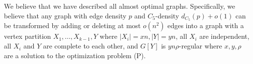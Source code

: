 \documentclass[12pt]{article}
\def\MR#1{}
\theoremstyle{definition}
\theoremstyle{remark}
\begin{document}
We believe that we have described all almost optimal graphs. Specifically, we believe that any graph with edge density $p$ and $C_5$-density $d_{C_5}(p)+o(1)$ can be transformed by adding or deleting at most $o(n^2)$ edges into a graph with a vertex partition $X_1, \ldots, X_{k-1}, Y$ where $|X_i|=xn, |Y|=yn$, all $X_i$ are independent, all $X_i$ and $Y$ are complete to each other, and $G[Y]$ is $yn\rho$-regular where $x, y, \rho$ are a solution to the optimization problem (P).
\providecommand{\bysame}{\leavevmode\hbox to3em{\hrulefill}\thinspace}
\providecommand{\MR}{\relax\ifhmode\unskip\space\fi MR }
\providecommand{\MRhref}[2]{%
  \href{http://www.ams.org/mathscinet-getitem?mr=#1}{#2}

}
%
%
\end{document}
